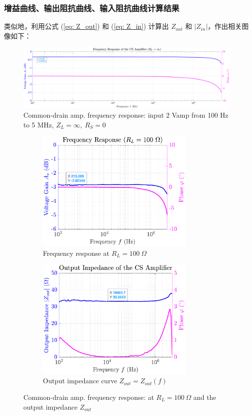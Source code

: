\documentclass[UTF8]{article}
\begin{document}
\subsubsection{增益曲线、输出阻抗曲线、输入阻抗曲线计算结果}

类似地，利用公式 (\ref{eq: Z_out}) 和 (\ref{eq: Z_in}) 计算出 $Z_{out}$ 和 $|Z_{in}|$，作出相关图像如下：


\begin{figure}[H]\centering
    \includegraphics[width=\columnwidth]{LCE-04-场效应管/assets/cd amp/cd gain.pdf}
    \caption{Common-drain amp. frequency response: input 2 Vamp from 100 Hz to 5 MHz, $Z_L = \infty,\ R_S = 0$}
\end{figure}
\vspace*{-3mm}
\begin{figure}[H]\centering
\begin{subfigure}[b]{0.5\columnwidth}\centering
    \includegraphics[width=220pt]{LCE-04-场效应管/assets/cd amp/cd gain, R_L = 100.pdf}
    \caption{Frequency response at $R_L = 100\ \Omega$}
\end{subfigure}\hfill
\begin{subfigure}[b]{0.5\columnwidth}\centering
    \includegraphics[width=220pt]{LCE-04-场效应管/assets/cd amp/cd Z_out.pdf}
    \caption{Output impedance curve $Z_{out} = Z_{out}(f)$}
\end{subfigure}
\caption{Common-drain amp. frequency response:  at $R_L = 100 \ \Omega$ and the output impedance $Z_{out}$}
\end{figure}
\end{document}
